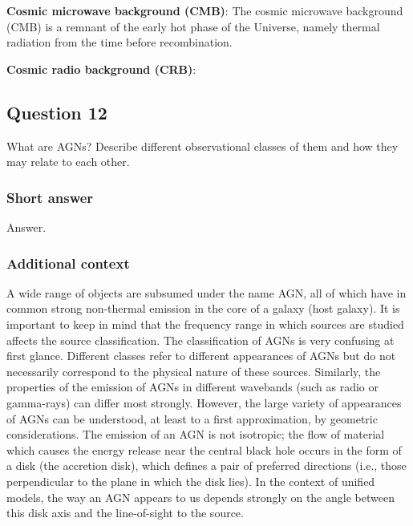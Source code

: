 \documentclass[a4paper,11pt]{article}
\begin{document}
{\noindent}\textbf{Cosmic microwave background (CMB)}: The cosmic microwave background (CMB) is a remnant of the early hot phase of the Universe, namely thermal radiation from the time before recombination. 

{\noindent}\textbf{Cosmic radio background (CRB)}: 


\newpage
\subsection{Question 12}

What are AGNs? Describe different observational classes of them and how they may relate to each other.

\subsubsection{Short answer}

Answer.

\subsubsection{Additional context}

A wide range of objects are subsumed under the name AGN, all of which have in common strong non-thermal emission in the core of a galaxy (host galaxy). It is important to keep in mind that the frequency range in which sources are studied affects the source classification. The classification of AGNs is very confusing at first glance. Different classes refer to different appearances of AGNs but do not necessarily correspond to the physical nature of these sources. Similarly, the properties of the emission of AGNs in different wavebands (such as radio or gamma-rays) can differ most strongly. However, the large variety of appearances of AGNs can be understood, at least to a first approximation, by geometric considerations. The emission of an AGN is not isotropic; the flow of material which causes the energy release near the central black hole occurs in the form of a disk (the accretion disk), which defines a pair of preferred directions (i.e., those perpendicular to the plane in which the disk lies). In the context of unified models, the way an AGN appears to us depends strongly on the angle between this disk axis and the line-of-sight to the source.
\end{document}
